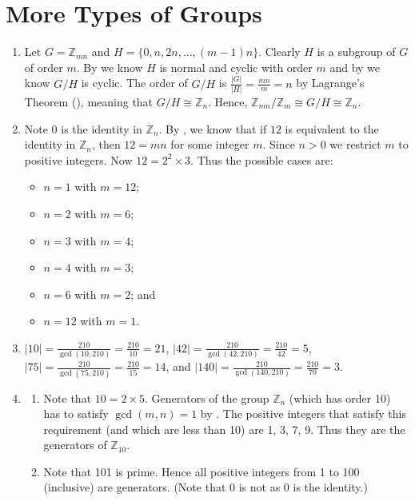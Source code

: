 \section{More Types of Groups}
\begin{enumerate}
    \item Let $G = \mathbb{Z}_{mn}$ and $H = \{0, n, 2n, \dots, (m-1)n\}$. Clearly $H$ is a subgroup of $G$ of order $m$. By  we know $H$ is normal and cyclic with order $m$ and by  we know $G/H$ is cyclic. The order of $G/H$ is $\frac{|G|}{|H|} = \frac{mn}{m} = n$ by Lagrange's Theorem (), meaning that $G/H \cong \mathbb{Z}_n$. Hence, $\mathbb{Z}_{mn}/\mathbb{Z}_m \cong G/H \cong \mathbb{Z}_n$.
    
    \item Note 0 is the identity in $\mathbb{Z}_n$. By , we know that if $12$ is equivalent to the identity in $\mathbb{Z}_n$, then $12 = mn$ for some integer $m$. Since $n > 0$ we restrict $m$ to positive integers. Now $12 = 2^2 \times 3$. Thus the possible cases are:
    \begin{itemize}
        \item $n = 1$ with $m = 12$;
        \item $n = 2$ with $m = 6$;
        \item $n = 3$ with $m = 4$;
        \item $n = 4$ with $m = 3$;
        \item $n = 6$ with $m = 2$; and
        \item $n = 12$ with $m = 1$.
    \end{itemize}

    \item $|10| = \frac{210}{\gcd(10, 210)} = \frac{210}{10} = 21$, $|42| = \frac{210}{\gcd(42, 210)} = \frac{210}{42} = 5$, $|75| = \frac{210}{\gcd(75, 210)} = \frac{210}{15} = 14$, and $|140| = \frac{210}{\gcd(140, 210)} = \frac{210}{70} = 3$.

    \item \begin{enumerate}[label=(\alph*)]
        \item Note that $10 = 2 \times 5$. Generators of the group $\mathbb{Z}_n$ (which has order 10) has to satisfy $\gcd(m,n) = 1$ by . The positive integers that satisfy this requirement (and which are less than 10) are 1, 3, 7, 9. Thus they are the generators of $\mathbb{Z}_{10}$.
        \item Note that 101 is prime. Hence all positive integers from 1 to 100 (inclusive) are generators. (Note that 0 is not as 0 is the identity.)
    \end{enumerate}


\end{enumerate}
